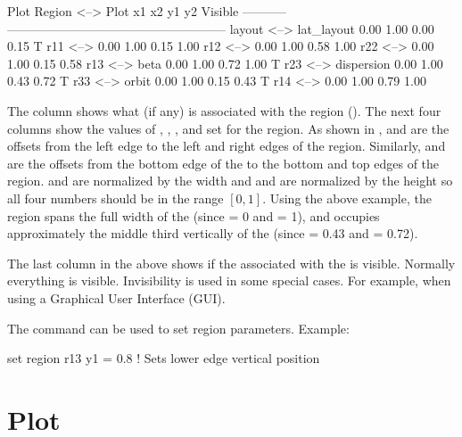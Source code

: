 {{\begin{example}
Plot Region         <-->  Plot                 x1    x2    y1    y2     Visible
-----------               -----------------------------------------------------
layout              <-->  lat_layout          0.00  1.00  0.00  0.15         T
r11                 <-->                      0.00  1.00  0.15  1.00
r12                 <-->                      0.00  1.00  0.58  1.00
r22                 <-->                      0.00  1.00  0.15  0.58
r13                 <-->  beta                0.00  1.00  0.72  1.00         T
r23                 <-->  dispersion          0.00  1.00  0.43  0.72         T
r33                 <-->  orbit               0.00  1.00  0.15  0.43         T
r14                 <-->                      0.00  1.00  0.79  1.00
\end{example}
The  column shows what  (if any) is associated with the region
(). The next four columns show the values of , , , and 
set for the region. As shown in ,  and  are the offsets from the
left  edge to the left and right edges of the region. Similarly,  and 
are the offsets from the bottom edge of the  to the bottom and top edges of the
region.  and  are normalized by the  width and  and  are
normalized by the  height so all four numbers should be in the range $[0, 1]$.  Using
the above example, the  region spans the full width of the  (since  = 0
and  = 1), and occupies approximately the middle third vertically of the 
(since  = 0.43 and  = 0.72).

The last column in the above shows if the  associated with the  is
visible. Normally everything is visible. Invisibility is used in some special cases. For example,
when using a Graphical User Interface (GUI).

The  command can be used to set region parameters. Example:
\begin{example}
  set region r13 y1 = 0.8  ! Sets lower edge vertical position
\end{example}

\section{Plot}
\label{s:plot.def}

}}
